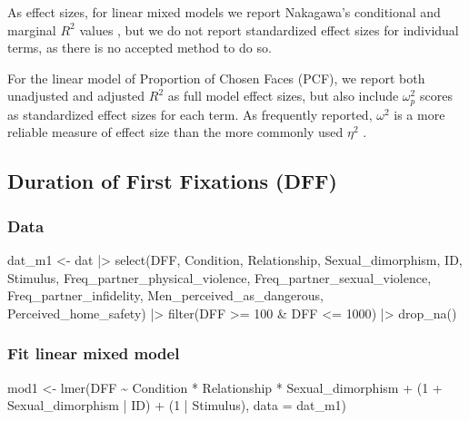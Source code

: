 \documentclass[
  bookmarksnumbered]{article}
\newenvironment{Shaded}{\begin{snugshade}}{\end{snugshade}}
\newcommand{\AttributeTok}[1]{\textcolor[rgb]{0.80,0.80,0.80}{#1}}
\newcommand{\DecValTok}[1]{\textcolor[rgb]{0.86,0.86,0.80}{#1}}
\newcommand{\FunctionTok}[1]{\textcolor[rgb]{0.94,0.94,0.56}{#1}}
\newcommand{\NormalTok}[1]{\textcolor[rgb]{0.80,0.80,0.80}{#1}}
\newcommand{\OtherTok}[1]{\textcolor[rgb]{0.94,0.94,0.56}{#1}}
\newcommand{\SpecialCharTok}[1]{\textcolor[rgb]{0.86,0.64,0.64}{#1}}
\begin{document}
As effect sizes, for linear mixed models we report Nakagawa's conditional and marginal \(R^2\) values \autocite{nakagawaGeneralSimpleMethod2013}, but we do not report standardized effect sizes for individual terms, as there is no accepted method to do so.

For the linear model of Proportion of Chosen Faces (PCF), we report both unadjusted and adjusted \(R^2\) as full model effect sizes, but also include \(\omega^2_p\) scores as standardized effect sizes for each term. As frequently reported, \(\omega^2\) is a more reliable measure of effect size than the more commonly used \(\eta^2\) \autocite[e.g.,][]{kroesDemystifyingOmegaSquared2023}.

\subsection{Duration of First Fixations (DFF)}\label{duration-of-first-fixations-dff}

\subsubsection{Data}\label{data}

\begin{Shaded}
\begin{Highlighting}[]
\NormalTok{dat\_m1 }\OtherTok{\textless{}{-}}\NormalTok{ dat }\SpecialCharTok{|\textgreater{}} 
  \FunctionTok{select}\NormalTok{(DFF, Condition, Relationship, Sexual\_dimorphism,}
\NormalTok{         ID, Stimulus,}
\NormalTok{         Freq\_partner\_physical\_violence, Freq\_partner\_sexual\_violence,}
\NormalTok{         Freq\_partner\_infidelity, Men\_perceived\_as\_dangerous,}
\NormalTok{         Perceived\_home\_safety) }\SpecialCharTok{|\textgreater{}} 
  \FunctionTok{filter}\NormalTok{(DFF }\SpecialCharTok{\textgreater{}=} \DecValTok{100} \SpecialCharTok{\&}\NormalTok{ DFF }\SpecialCharTok{\textless{}=} \DecValTok{1000}\NormalTok{) }\SpecialCharTok{|\textgreater{}} 
  \FunctionTok{drop\_na}\NormalTok{()}
\end{Highlighting}
\end{Shaded}

\subsubsection{Fit linear mixed model}\label{fit-linear-mixed-model}

\begin{Shaded}
\begin{Highlighting}[]
\NormalTok{mod1 }\OtherTok{\textless{}{-}} \FunctionTok{lmer}\NormalTok{(DFF }\SpecialCharTok{\textasciitilde{}}\NormalTok{ Condition }\SpecialCharTok{*}\NormalTok{ Relationship }\SpecialCharTok{*}\NormalTok{ Sexual\_dimorphism }\SpecialCharTok{+}
\NormalTok{               (}\DecValTok{1} \SpecialCharTok{+}\NormalTok{ Sexual\_dimorphism }\SpecialCharTok{|}\NormalTok{ ID) }\SpecialCharTok{+}\NormalTok{ (}\DecValTok{1} \SpecialCharTok{|}\NormalTok{ Stimulus), }
             \AttributeTok{data =}\NormalTok{ dat\_m1)}
\end{Highlighting}
\end{Shaded}
\end{document}
